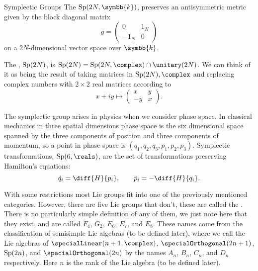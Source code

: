 \documentclass[fleqn]{NotesClass}
\newcommand{\ident}{1}
\renewcommand{\field}{\symbb{k}}
\begin{document}
    \begin{dfn}{Symplectic Groups}{}
        The  \(\symplectic(2N, \field)\)\index{Sp(2n, k)@\(\symplectic(2n, \field)\)|see{symplectic group}}, preserves an antisymmetric metric given by the block diagonal matrix
        \begin{equation}
            g = 
            \begin{pmatrix}
                0 & \ident_N\\
                -\ident_N & 0
            \end{pmatrix}
        \end{equation}
        on a \(2N\)-dimensional vector space over \(\field\).
        
        The , \(\operatorname{Sp}(2N)\), is \(\symplectic(2N) = \symplectic(2N, \complex) \cap \unitary(2N)\).
        We can think of it as being the result of taking matrices in \(\symplectic(2N), \complex\) and replacing complex numbers with \(2\times 2\) real matrices according to
        \begin{equation}
            x + iy \mapsto 
            \begin{pmatrix}
                x & y\\
                -y & x
            \end{pmatrix}
            .
        \end{equation}
    \end{dfn}
    
    The symplectic group arises in physics when we consider phase space.
    In classical mechanics in three spatial dimensions phase space is the six dimensional space spanned by the three components of position and three components of momentum, so a point in phase space is \((q_1, q_2, q_3, p_1, p_2, p_3)\).
    Symplectic transformations, \(\symplectic(6, \reals)\), are the set of transformations preserving Hamilton's equations:
    \begin{equation}
        \dot{q}_i = \diff{H}{p_i}, \qquad \dot{p}_i = -\diff{H}{q_i}.
    \end{equation}
    
    With some restrictions most Lie groups fit into one of the previously mentioned categories.
    However, there are five Lie groups that don't, these are called the .
    There is no particularly simple definition of any of them, we just note here that they exist, and are called \(F_4\), \(G_2\), \(E_6\), \(E_7\), and \(E_8\).
    These names come from the classification of semisimple Lie algebras (to be defined later), where we call the Lie algebras of \(\specialLinear(n + 1, \complex)\), \(\specialOrthogonal(2n + 1)\), \(\operatorname{Sp}(2n)\), and \(\specialOrthogonal(2n)\) by the names \(A_n\), \(B_n\), \(C_n\), and \(D_n\) respectively.
    Here \(n\) is the rank of the Lie algebra (to be defined later).
    
\end{document}
